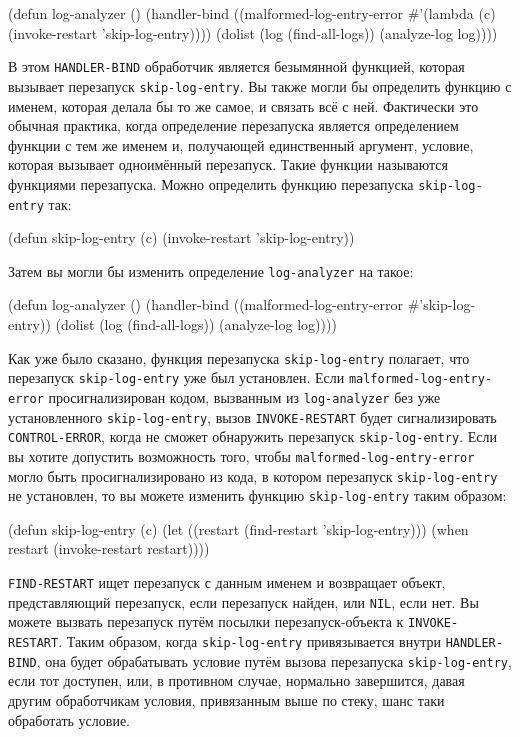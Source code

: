 \begin{myverb}
(defun log-analyzer ()
  (handler-bind ((malformed-log-entry-error
                  #'(lambda (c)
                      (invoke-restart 'skip-log-entry))))
    (dolist (log (find-all-logs))
      (analyze-log log))))
\end{myverb}

В этом \lstinline{HANDLER-BIND} обработчик является безымянной функцией, которая вызывает
перезапуск \lstinline{skip-log-entry}. Вы также могли бы определить функцию с именем, которая
делала бы то же самое, и связать всё с ней. Фактически это обычная практика, когда
определение перезапуска является определением функции с тем же именем и, получающей
единственный аргумент, условие, которая вызывает одноимённый перезапуск. Такие функции
называются функциями перезапуска. Можно определить функцию перезапуска
\lstinline{skip-log-entry} так:

\begin{myverb}
(defun skip-log-entry (c)
  (invoke-restart 'skip-log-entry))
\end{myverb}

Затем вы могли бы изменить определение \lstinline{log-analyzer} на такое:

\begin{myverb}
(defun log-analyzer ()
  (handler-bind ((malformed-log-entry-error #'skip-log-entry))
    (dolist (log (find-all-logs))
      (analyze-log log))))
\end{myverb}

Как уже было сказано, функция перезапуска \lstinline{skip-log-entry} полагает, что перезапуск
\lstinline{skip-log-entry} уже был установлен. Если \lstinline{malformed-log-entry-error}
просигнализирован кодом, вызванным из \lstinline{log-analyzer} без уже установленного
\lstinline{skip-log-entry}, вызов \lstinline{INVOKE-RESTART} будет сигнализировать
\lstinline{CONTROL-ERROR}, когда не сможет обнаружить перезапуск \lstinline{skip-log-entry}. Если вы
хотите допустить возможность того, чтобы \lstinline{malformed-log-entry-error} могло быть
просигнализировано из кода, в котором перезапуск \lstinline{skip-log-entry} не установлен, то вы
можете изменить функцию \lstinline{skip-log-entry} таким образом:

\begin{myverb}
(defun skip-log-entry (c)
  (let ((restart (find-restart 'skip-log-entry)))
    (when restart (invoke-restart restart))))
\end{myverb}

\lstinline{FIND-RESTART} ищет перезапуск с данным именем и возвращает объект, представляющий
перезапуск, если перезапуск найден, или \lstinline{NIL}, если нет. Вы можете вызвать перезапуск
путём посылки перезапуск-объекта к \lstinline{INVOKE-RESTART}. Таким образом, когда
\lstinline{skip-log-entry} привязывается внутри \lstinline{HANDLER-BIND}, она будет обрабатывать
условие путём вызова перезапуска \lstinline{skip-log-entry}, если тот доступен, или, в противном
случае, нормально завершится, давая другим обработчикам условия, привязанным выше по
стеку, шанс таки обработать условие.

